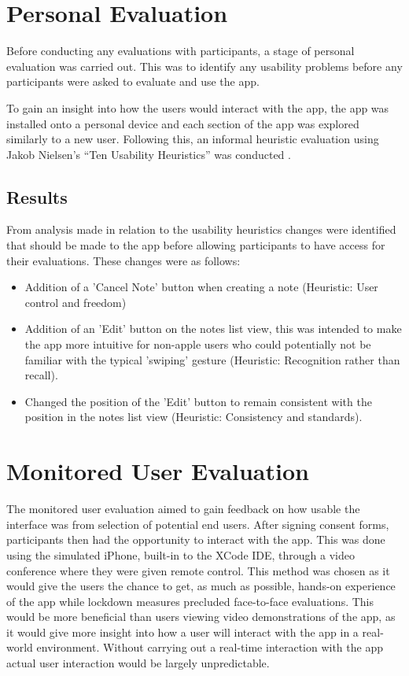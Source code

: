 \documentclass{l4proj}
\begin{document}
\section{Personal Evaluation}

Before conducting any evaluations with participants, a stage of personal evaluation was carried out. This was to identify any usability problems before any participants were asked to evaluate and use the app. 
 
To gain an insight into how the users would interact with the app, the app was installed onto a personal device and each section of the app was explored similarly to a new user. Following this, an informal heuristic evaluation using Jakob Nielsen’s “Ten Usability Heuristics” was conducted \citep{Nielsen10}. 

\subsection{Results}

From analysis made in relation to the usability heuristics changes were identified that should be made to the app before allowing participants to have access for their evaluations. These changes were as follows:
\begin{itemize}
    \item Addition of a 'Cancel Note' button when creating a note (Heuristic: User control and freedom)
    \item Addition of an 'Edit' button on the notes list view, this was intended to make the app more intuitive for non-apple users who could potentially not be familiar with the typical 'swiping' gesture (Heuristic: Recognition rather than recall).
    \item Changed the position of the 'Edit' button to remain consistent with the position in the notes list view (Heuristic: Consistency and standards).
\end{itemize}


\section{Monitored User Evaluation}

The monitored user evaluation aimed to gain feedback on how usable the interface was from selection of potential end users. After signing consent forms, participants then had the opportunity to interact with the app. This was done using the simulated iPhone, built-in to the XCode IDE, through a video conference where they were given remote control. This method was chosen as it would give the users the chance to get, as much as possible, hands-on experience of the app while lockdown measures precluded face-to-face evaluations. This would be more beneficial than users viewing video demonstrations of the app, as it would give more insight into how a user will interact with the app in a real-world environment. Without carrying out a real-time interaction with the app actual user interaction would be largely unpredictable.
\end{document}
